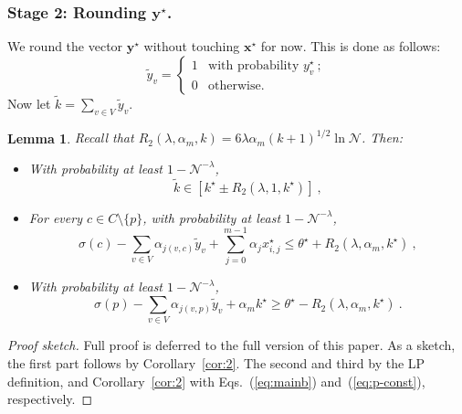 \documentclass[letterpaper]{article} %
\newtheorem{lemma}[theorem]{Lemma}
\theoremstyle{definition}
\newcommand{\NN}{\mathcal{N}}
\newcommand\vecc{\mathbf}
\begin{document}
\subsubsection{Stage 2: Rounding $\vecc{y^\star }$.}
We round the vector $\vecc{y^\star }$ without touching $\vecc{x^\star }$ for now. This is done as follows:
\begin{equation*}
\tilde{y}_v = \begin{cases}
1 & \text{with probability } y^\star _v\ ;\\
0 & \text{otherwise.}
\end{cases}
\end{equation*}
Now let $\tilde{k}=\sum_{v \in V}\tilde{y}_v$.
\begin{lemma}\label{eq:factor-b}
	 Recall that  $R_2(\lambda, \alpha_{m},k)= 6\lambda\alpha_{m} (k+1)^{1/2} \ln \NN $. Then:
	\begin{itemize}
		\item With probability at least $1-\NN^{-\lambda}$,
		\begin{equation*}
		\tilde{k} \in [k^\star  \pm R_2(\lambda, 1,k^\star)]\ ,
		\end{equation*}
		\item For every $c \in C\setminus\{p\}$, with probability at least $1-\NN^{-\lambda}$, 
		\begin{equation*}
		\sigma(c) - \sum_{v \in V}\alpha_{j(v,c)} \tilde{y}_{v} + \sum_{j=0}^{m-1}\alpha_j x^{\star }_{i,j} 
		\leq \theta^\star  +  R_2(\lambda, \alpha_{m},k^\star)\ ,
		\end{equation*}
		\item With probability at least $1-\NN^{-\lambda}$, 
		\begin{equation*}
		\sigma(p) - \sum_{v \in V}\alpha_{j(v,p)} \tilde{y}_{v} + \alpha_m k^\star \geq \theta^\star -  R_2(\lambda, \alpha_{m},k^\star)\ .
		\end{equation*}
	\end{itemize}
	
\end{lemma}
\begin{proof}[Proof sketch] Full proof is deferred to the full version of this paper. As a sketch,
	the first part follows by Corollary~\ref{cor:2}. The second and third by the LP definition, and Corollary~\ref{cor:2} with Eqs.~(\ref{eq:mainb}) and~(\ref{eq:p-const}), respectively.
\end{proof}
\end{document}
